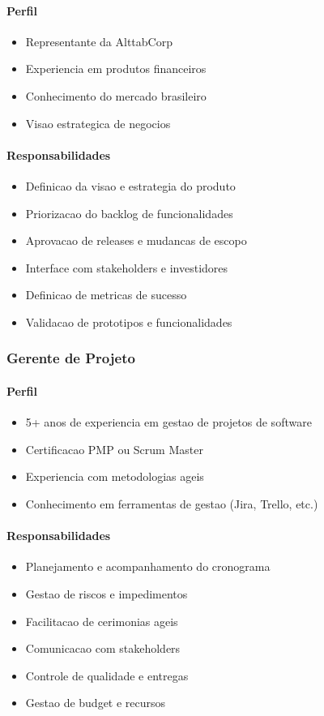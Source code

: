 \paragraph{Perfil}
\begin{itemize}
    \item Representante da AlttabCorp
    \item Experiencia em produtos financeiros
    \item Conhecimento do mercado brasileiro
    \item Visao estrategica de negocios
\end{itemize}

\paragraph{Responsabilidades}
\begin{itemize}
    \item Definicao da visao e estrategia do produto
    \item Priorizacao do backlog de funcionalidades
    \item Aprovacao de releases e mudancas de escopo
    \item Interface com stakeholders e investidores
    \item Definicao de metricas de sucesso
    \item Validacao de prototipos e funcionalidades
\end{itemize}

\subsubsection{Gerente de Projeto}
\paragraph{Perfil}
\begin{itemize}
    \item 5+ anos de experiencia em gestao de projetos de software
    \item Certificacao PMP ou Scrum Master
    \item Experiencia com metodologias ageis
    \item Conhecimento em ferramentas de gestao (Jira, Trello, etc.)
\end{itemize}

\paragraph{Responsabilidades}
\begin{itemize}
    \item Planejamento e acompanhamento do cronograma
    \item Gestao de riscos e impedimentos
    \item Facilitacao de cerimonias ageis
    \item Comunicacao com stakeholders
    \item Controle de qualidade e entregas
    \item Gestao de budget e recursos
\end{itemize}

